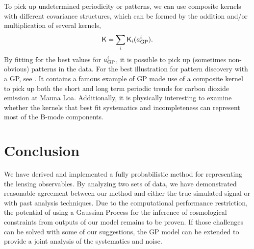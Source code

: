 To pick up undetermined periodicity or patterns, 
we can use composite kernels with different covariance structures, 
which can be formed by the addition and/or multiplication of several kernels,
\begin{equation}
	\mathsf{K} = \sum_i \mathsf{K}_i(a_{\rm GP}^i).
\end{equation}
By fitting for the best values for $a_{\rm GP}^i$, it is possible  
to pick up (sometimes non-obvious) patterns in the data. 
For the best illustration for pattern discovery with a GP, see
\cite{Duvenaud2013}.
It contains a famous example of GP made use of a composite kernel to pick up both the 
short and long term periodic trends for carbon dioxide emission at Mauna Loa.
Additionally, it is physically interesting to examine whether the kernels that best 
fit systematics and incompleteness can represent most of the B-mode components. 





\section{Conclusion}
We have derived and implemented a fully probabilistic method for 
representing the lensing observables. By analyzing two sets of data, 
we have demonstrated reasonable agreement between our method and either the true
simulated signal or with past analysis techniques.  
Due to the computational performance restriction,  
the potential of using a Gaussian Process for the inference of cosmological
constraints from outputs of our model remains to be proven. 
If those challenges can be solved with some of our
suggestions, the GP model can be 
extended to provide a joint analysis of the systematics and noise. 


